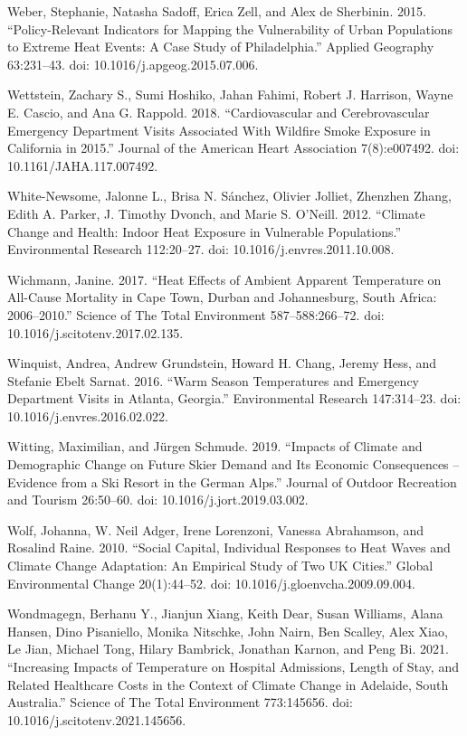 \documentclass[12pt]{article}
\begin{document}
Weber, Stephanie, Natasha Sadoff, Erica Zell, and Alex de Sherbinin.
2015. ``Policy-Relevant Indicators for Mapping the Vulnerability of
Urban Populations to Extreme Heat Events: A Case Study of
Philadelphia.'' Applied Geography 63:231--43. doi:
10.1016/j.apgeog.2015.07.006.

Wettstein, Zachary S., Sumi Hoshiko, Jahan Fahimi, Robert J. Harrison,
Wayne E. Cascio, and Ana G. Rappold. 2018. ``Cardiovascular and
Cerebrovascular Emergency Department Visits Associated With Wildfire
Smoke Exposure in California in 2015.'' Journal of the American Heart
Association 7(8):e007492. doi: 10.1161/JAHA.117.007492.

White-Newsome, Jalonne L., Brisa N. Sánchez, Olivier Jolliet, Zhenzhen
Zhang, Edith A. Parker, J. Timothy Dvonch, and Marie S. O'Neill. 2012.
``Climate Change and Health: Indoor Heat Exposure in Vulnerable
Populations.'' Environmental Research 112:20--27. doi:
10.1016/j.envres.2011.10.008.

Wichmann, Janine. 2017. ``Heat Effects of Ambient Apparent Temperature
on All-Cause Mortality in Cape Town, Durban and Johannesburg, South
Africa: 2006--2010.'' Science of The Total Environment 587--588:266--72.
doi: 10.1016/j.scitotenv.2017.02.135.

Winquist, Andrea, Andrew Grundstein, Howard H. Chang, Jeremy Hess, and
Stefanie Ebelt Sarnat. 2016. ``Warm Season Temperatures and Emergency
Department Visits in Atlanta, Georgia.'' Environmental Research
147:314--23. doi: 10.1016/j.envres.2016.02.022.

Witting, Maximilian, and Jürgen Schmude. 2019. ``Impacts of Climate and
Demographic Change on Future Skier Demand and Its Economic Consequences
-- Evidence from a Ski Resort in the German Alps.'' Journal of Outdoor
Recreation and Tourism 26:50--60. doi: 10.1016/j.jort.2019.03.002.

Wolf, Johanna, W. Neil Adger, Irene Lorenzoni, Vanessa Abrahamson, and
Rosalind Raine. 2010. ``Social Capital, Individual Responses to Heat
Waves and Climate Change Adaptation: An Empirical Study of Two UK
Cities.'' Global Environmental Change 20(1):44--52. doi:
10.1016/j.gloenvcha.2009.09.004.

Wondmagegn, Berhanu Y., Jianjun Xiang, Keith Dear, Susan Williams, Alana
Hansen, Dino Pisaniello, Monika Nitschke, John Nairn, Ben Scalley, Alex
Xiao, Le Jian, Michael Tong, Hilary Bambrick, Jonathan Karnon, and Peng
Bi. 2021. ``Increasing Impacts of Temperature on Hospital Admissions,
Length of Stay, and Related Healthcare Costs in the Context of Climate
Change in Adelaide, South Australia.'' Science of The Total Environment
773:145656. doi: 10.1016/j.scitotenv.2021.145656.
\end{document}
